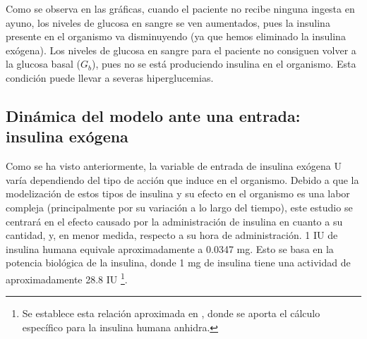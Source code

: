 Como se observa en las gráficas, cuando el paciente no recibe ninguna ingesta en ayuno, los niveles de glucosa en sangre se ven aumentados, pues la insulina presente en el organismo va disminuyendo (ya que hemos eliminado la insulina exógena). Los niveles de glucosa en sangre para el paciente no consiguen volver a la glucosa basal ($G_b$), pues no se está produciendo insulina en el organismo. Esta condición puede llevar a severas hiperglucemias.

\subsection{Dinámica del modelo ante una entrada: insulina exógena}

Como se ha visto anteriormente, la variable de entrada de insulina exógena U varía dependiendo del tipo de acción que induce en el organismo.
Debido a que la modelización de estos tipos de insulina y su efecto en el organismo es una labor compleja (principalmente por su variación a lo largo del tiempo), este estudio se centrará en el efecto causado por la administración de insulina en cuanto a su cantidad, y, en menor medida, respecto a su hora de administración.
1 IU de insulina humana equivale aproximadamente a 0.0347 mg. Esto se basa en la potencia biológica de la insulina, donde 1 mg de insulina tiene una actividad de aproximadamente 28.8 IU \footnote{Se establece esta relación aproximada en \cite{cima_insulina}, donde se aporta el cálculo específico para la insulina humana anhidra.}.

